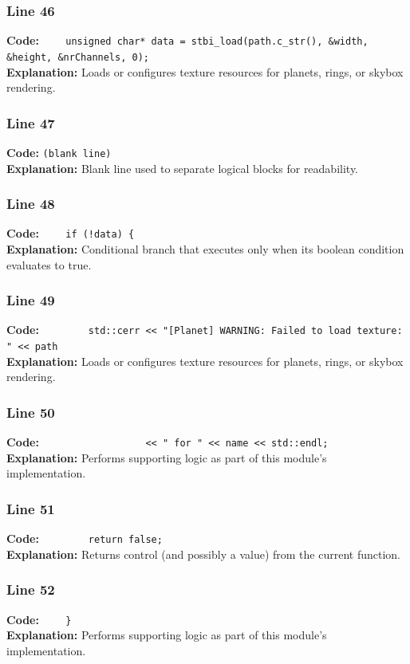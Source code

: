 \documentclass[11pt,a4paper]{article}
\begin{document}
\subsubsection*{Line 46}
\textbf{Code:} \verb|    unsigned char* data = stbi_load(path.c_str(), &width, &height, &nrChannels, 0);|\\
\textbf{Explanation:} Loads or configures texture resources for planets, rings, or skybox rendering.

\subsubsection*{Line 47}
\textbf{Code:} \texttt{(blank line)}\\
\textbf{Explanation:} Blank line used to separate logical blocks for readability.

\subsubsection*{Line 48}
\textbf{Code:} \verb|    if (!data) {|\\
\textbf{Explanation:} Conditional branch that executes only when its boolean condition evaluates to true.

\subsubsection*{Line 49}
\textbf{Code:} \verb|        std::cerr << "[Planet] WARNING: Failed to load texture: " << path|\\
\textbf{Explanation:} Loads or configures texture resources for planets, rings, or skybox rendering.

\subsubsection*{Line 50}
\textbf{Code:} \verb|                  << " for " << name << std::endl;|\\
\textbf{Explanation:} Performs supporting logic as part of this module's implementation.

\subsubsection*{Line 51}
\textbf{Code:} \verb|        return false;|\\
\textbf{Explanation:} Returns control (and possibly a value) from the current function.

\subsubsection*{Line 52}
\textbf{Code:} \verb|    }|\\
\textbf{Explanation:} Performs supporting logic as part of this module's implementation.
\end{document}
